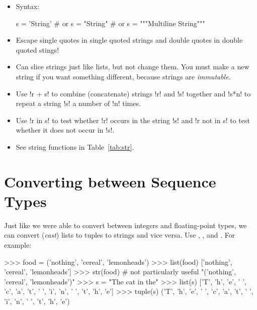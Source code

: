 \documentclass[11pt]{cselabheader}
\begin{document}
\begin{itemize}
  \item Syntax:

    \begin{python3code}
s = 'String'
# or
s = "String"
# or
s = """Multiline
String"""
    \end{python3code}

  \item Escape single quotes in single quoted strings and double quotes in
    double quoted stings!

  \item Can slice strings just like lists, but not change them. You must make a
    new string if you want something different, because strings are
    \emph{immutable}.

  \item Use \pythoninline!r + s! to combine (concatenate) strings \pythoninline!r! and
    \pythoninline!s! together and
    \pythoninline!s*n! to repeat a string \pythoninline!s! a number of \pythoninline!n!
    times.

  \item Use \pythoninline!r in s! to test whether \pythoninline!r! occurs in the
    string \pythoninline!s! and \pythoninline!r not in s! to test whether it does not
    occur in \pythoninline!s!.

  \item See string functions in Table~\ref{tab:str}.
\end{itemize}

\pagebreak
\section{Converting between Sequence Types}

Just like we were able to convert between integers and floating-point types, we
can convert (\emph{cast}) lists to tuples to strings and vice versa. Use
, , and . For
example:

\begin{pyconcode}
>>> food = ('nothing', 'cereal', 'lemonheads')
>>> list(food)
['nothing', 'cereal', 'lemonheads']
>>> str(food) # not particularly useful
"('nothing', 'cereal', 'lemonheads')"
>>> s = "The cat in the"
>>> list(s)
['T', 'h', 'e', ' ', 'c', 'a', 't', ' ', 'i', 'n', ' ', 't', 'h', 'e']
>>> tuple(s)
('T', 'h', 'e', ' ', 'c', 'a', 't', ' ', 'i', 'n', ' ', 't', 'h', 'e')
\end{pyconcode}
\end{document}
